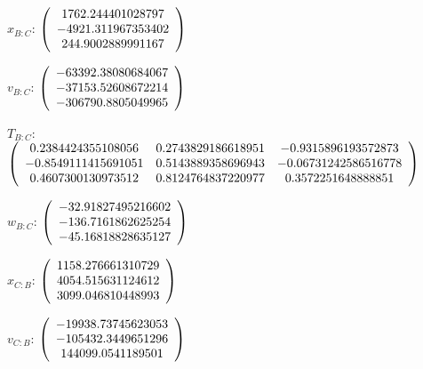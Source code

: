 \begin{description}
$x_{B:C}$: $\left( \begin{array} {ccc}  1762.244401028797 \\    -4921.311967353402 \\     244.9002889991167
\end{array} \right)\\ \\$

$v_{B:C}$:  $\left( \begin{array} {ccc}  -63392.38080684067 \\    -37153.52608672214 \\    -306790.8805049965
\end{array} \right)\\ \\$

$T_{B:C}$: $\left( \begin{array} {ccc}
 0.2384424355108056 &    0.2743829186618951 &   -0.9315896193572873  \\
 -0.8549111415691051 &    0.5143889358696943 &  -0.06731242586516778 \\
 0.4607300130973512 &    0.8124764837220977 &    0.3572251648888851 \\
\end{array} \right)\\ \\$

$w_{B:C}$:  $\left( \begin{array} {ccc}  -32.91827495216602 \\    -136.7161862625254 \\    -45.16818828635127
\end{array} \right)\\ \\$

$x_{C:B}$: $\left( \begin{array} {ccc} 1158.276661310729 \\     4054.515631124612 \\     3099.046810448993
\end{array} \right)\\ \\$

$v_{C:B}$:  $\left( \begin{array} {ccc} -19938.73745623053 \\    -105432.3449651296 \\     144099.0541189501
\end{array} \right)\\ \\$


\end{description}
